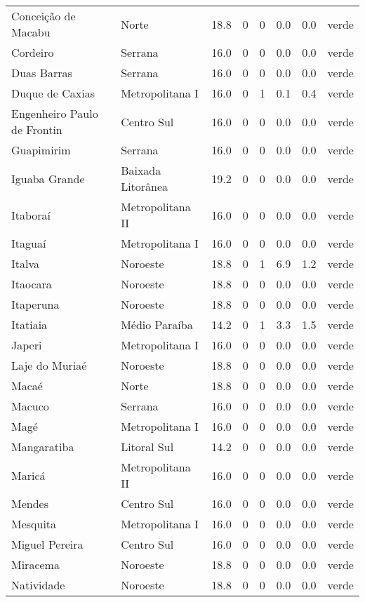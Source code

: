 \begin{longtable}{l|lllllll}
  Conceição de Macabu & Norte & 18.8 & 0 & 0 & 0.0 & 0.0 & verde \\ 
  Cordeiro & Serrana & 16.0 & 0 & 0 & 0.0 & 0.0 & verde \\ 
  Duas Barras & Serrana & 16.0 & 0 & 0 & 0.0 & 0.0 & verde \\ 
  Duque de Caxias & Metropolitana I & 16.0 & 0 & 1 & 0.1 & 0.4 & verde \\ 
  Engenheiro Paulo de Frontin & Centro Sul & 16.0 & 0 & 0 & 0.0 & 0.0 & verde \\ 
  Guapimirim & Serrana & 16.0 & 0 & 0 & 0.0 & 0.0 & verde \\ 
  Iguaba Grande & Baixada Litorânea & 19.2 & 0 & 0 & 0.0 & 0.0 & verde \\ 
  Itaboraí & Metropolitana II & 16.0 & 0 & 0 & 0.0 & 0.0 & verde \\ 
  Itaguaí & Metropolitana I & 16.0 & 0 & 0 & 0.0 & 0.0 & verde \\ 
  Italva & Noroeste & 18.8 & 0 & 1 & 6.9 & 1.2 & verde \\ 
  Itaocara & Noroeste & 18.8 & 0 & 0 & 0.0 & 0.0 & verde \\ 
  Itaperuna & Noroeste & 18.8 & 0 & 0 & 0.0 & 0.0 & verde \\ 
  Itatiaia & Médio Paraíba & 14.2 & 0 & 1 & 3.3 & 1.5 & verde \\ 
  Japeri & Metropolitana I & 16.0 & 0 & 0 & 0.0 & 0.0 & verde \\ 
  Laje do Muriaé & Noroeste & 18.8 & 0 & 0 & 0.0 & 0.0 & verde \\ 
  Macaé & Norte & 18.8 & 0 & 0 & 0.0 & 0.0 & verde \\ 
  Macuco & Serrana & 16.0 & 0 & 0 & 0.0 & 0.0 & verde \\ 
  Magé & Metropolitana I & 16.0 & 0 & 0 & 0.0 & 0.0 & verde \\ 
  Mangaratiba & Litoral Sul & 14.2 & 0 & 0 & 0.0 & 0.0 & verde \\ 
  Maricá & Metropolitana II & 16.0 & 0 & 0 & 0.0 & 0.0 & verde \\ 
  Mendes & Centro Sul & 16.0 & 0 & 0 & 0.0 & 0.0 & verde \\ 
  Mesquita & Metropolitana I & 16.0 & 0 & 0 & 0.0 & 0.0 & verde \\ 
  Miguel Pereira & Centro Sul & 16.0 & 0 & 0 & 0.0 & 0.0 & verde \\ 
  Miracema & Noroeste & 18.8 & 0 & 0 & 0.0 & 0.0 & verde \\ 
  Natividade & Noroeste & 18.8 & 0 & 0 & 0.0 & 0.0 & verde \\ 

\end{longtable}

